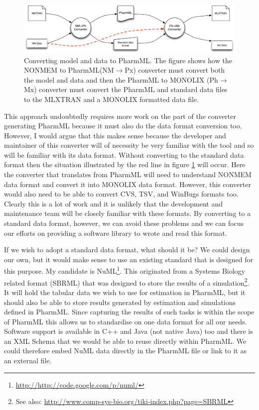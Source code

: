 \documentclass[a4paper,10pt]{article}
\newcommand{\pharmml}{PharmML\xspace}
\begin{document}
\begin{figure}[htbp]
\centering
\includegraphics[width=\linewidth]{DataConversion}
\caption{Converting model and data to \pharmml. The figure shows how
  the NONMEM to \pharmml (NM$\rightarrow$Px) converter must convert both the
  model and data and then the \pharmml to MONOLIX (Ph$\rightarrow$Mx) converter
  must convert the \pharmml and standard data files to the MLXTRAN and a
  MONOLIX formatted data file.}
\label{fig:data-conversion}
\end{figure}

This approach undoubtedly requires more work on the part of the
converter generating \pharmml because it must also do the data format
conversion too. However, I would argue that this makes sense because
the developer and maintainer of this converter will of necessity be
very familiar with the tool and so will be familiar with its data
format. Without converting to the standard data format then the
situation illustrated by the red line in figure \ref{fig:data-conversion}
will occur. Here the converter that translates from \pharmml will need
to understand NONMEM data format and convert it into MONOLIX data
format. However, this converter would also need to be able to convert
CVS, TSV, and WinBugs formats too. Clearly this is a lot of work and
it is unlikely that the development and maintenance team will be
closely familiar with these formats. By converting to a standard data
format, however, we can avoid these problems and we can focus our
efforts on providing a software library to wrote and read this
format.

If we wish to adopt a standard data format, what should it be? We
could design our own, but it would make sense to use an existing
standard that is designed for this purpose. My candidate is
NuML\footnote{\url{http://http://code.google.com/p/numl/}}. This
originated from a Systems Biology related format (SBRML) that was
designed to store the results of a simulation\footnote{See also:
  \url{http://www.comp-sys-bio.org/tiki-index.php?page=SBRML}}. It
will hold the tabular data we wish to use for estimation in \pharmml,
but it should also be able to store results generated by estimation
and simulations defined in \pharmml. Since capturing the results of
such tasks is within the scope of \pharmml this allows us to
standardise on one data format for all our needs. Software support is
available in C++ and Java (not native Java) too and there is an XML
Schema that we would be able to reuse directly within \pharmml. We
could therefore embed NuML data directly in the \pharmml file or link
to it as an external file.
\end{document}
